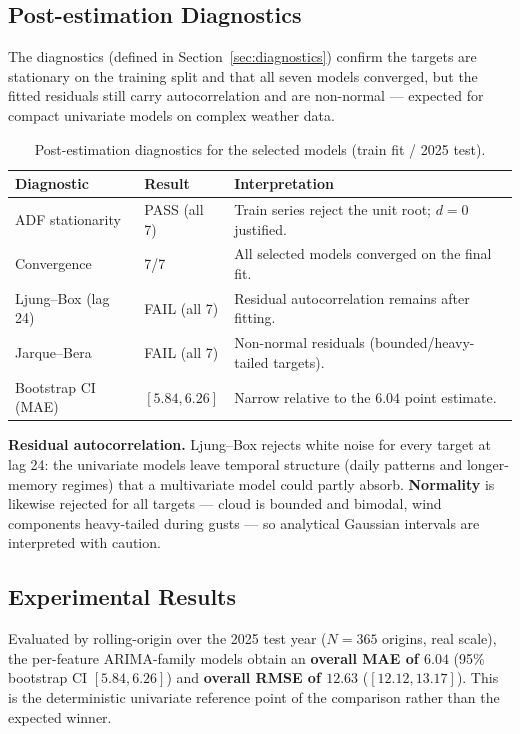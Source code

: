 \documentclass[12pt,a4paper,oneside]{report}
\begin{document}
\subsection{Post-estimation Diagnostics}
\label{sec:sarima-diag}
The diagnostics (defined in Section~\ref{sec:diagnostics}) confirm the targets are
stationary on the training split and that all seven models converged, but the
fitted residuals still carry autocorrelation and are non-normal --- expected for
compact univariate models on complex weather data.

\begin{table}[H]
\centering
\caption{Post-estimation diagnostics for the selected models (train fit / 2025 test).}
\label{tab:sarima-diag}
\begin{tabular}{l l p{6.6cm}}
\toprule
\textbf{Diagnostic} & \textbf{Result} & \textbf{Interpretation} \\
\midrule
ADF stationarity & PASS (all 7) & Train series reject the unit root; $d=0$ justified. \\
Convergence      & 7/7          & All selected models converged on the final fit. \\
Ljung--Box (lag 24) & FAIL (all 7) & Residual autocorrelation remains after fitting. \\
Jarque--Bera     & FAIL (all 7) & Non-normal residuals (bounded/heavy-tailed targets). \\
Bootstrap CI (MAE) & $[5.84,6.26]$ & Narrow relative to the $6.04$ point estimate. \\
\bottomrule
\end{tabular}
\end{table}

\textbf{Residual autocorrelation.} Ljung--Box rejects white noise for every
target at lag 24: the univariate models leave temporal structure (daily patterns
and longer-memory regimes) that a multivariate model could partly absorb.
\textbf{Normality} is likewise rejected for all targets --- cloud is bounded and
bimodal, wind components heavy-tailed during gusts --- so analytical Gaussian
intervals are interpreted with caution.

\subsection{Experimental Results}
Evaluated by rolling-origin over the 2025 test year ($N=365$ origins, real
scale), the per-feature ARIMA-family models obtain an \textbf{overall MAE of
$6.04$} (95\% bootstrap CI $[5.84,6.26]$) and \textbf{overall RMSE of $12.63$}
($[12.12,13.17]$). This is the deterministic univariate reference point of the
comparison rather than the expected winner.
\end{document}
